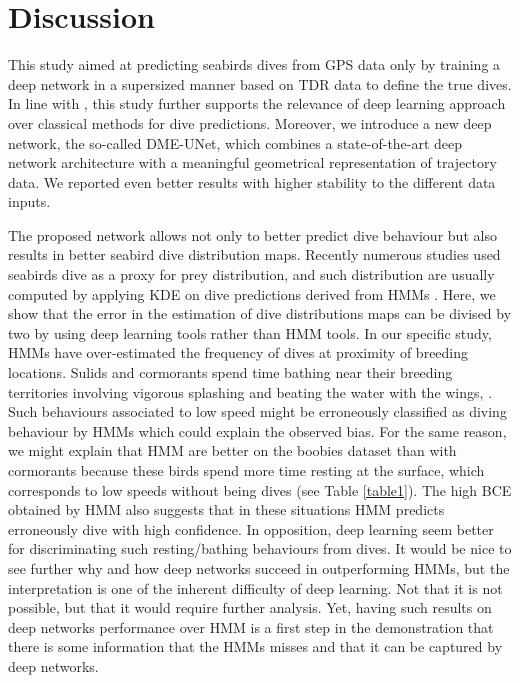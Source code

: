 \documentclass{article}
\begin{document}
\section{Discussion}
This study aimed at predicting seabirds dives from GPS data only by training a deep network in a supersized manner based on TDR data to define the true dives.
In line with \cite{browning_predicting_2018}, this study further  supports the relevance of deep learning approach over classical methods for dive predictions.
Moreover, we introduce a new deep network, the so-called DME-UNet, which combines a state-of-the-art deep network architecture with a meaningful geometrical representation of trajectory data. We reported even better results with higher stability to the different data inputs.

The proposed network allows not only to better predict dive behaviour but also results in better seabird dive distribution maps. Recently numerous studies used seabirds dive as a proxy for prey distribution, and such distribution are usually computed by applying KDE on dive predictions derived from HMMs \cite{delord_movements_2020,weimerskirch_at-sea_2020,zhang_gps_2019}.
Here, we show that the error in the estimation of dive distributions maps can be divised by two by using deep learning tools rather than HMM tools.
In our specific study, HMMs have over-estimated the frequency of dives at proximity of breeding locations. Sulids and cormorants  spend  time  bathing  near their breeding territories involving vigorous splashing and beating the water with the wings, \cite{nelson_pelicans_2005}. Such behaviours associated to low speed might be erroneously classified as diving behaviour by HMMs which could explain the observed bias. For the same reason, we might explain that HMM are better on the boobies dataset than with cormorants because these birds spend more time resting at the surface, which corresponds to low speeds without being dives (see Table \ref{table1}). The high BCE obtained by HMM also suggests that in these situations HMM predicts erroneously dive with high confidence.
In opposition, deep learning seem better for discriminating such resting/bathing behaviours from dives. It would be nice to see further why and how deep networks succeed in outperforming HMMs, but the interpretation is one of the inherent difficulty  of deep learning. Not that it is not possible, but that it would require further analysis. Yet, having such results on deep networks performance over HMM is a first step in the demonstration that there is some information that the HMMs misses and that it can be captured by deep networks.
\end{document}
